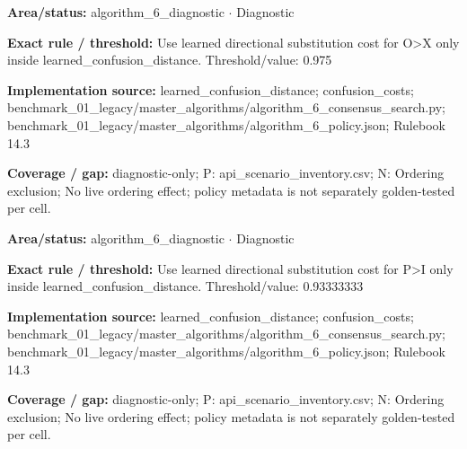 \begin{tcolorbox}[enhanced,breakable,colback=white,colframe=Muted!45,boxrule=0.45pt,arc=1.5pt,left=6pt,right=6pt,top=5pt,bottom=5pt,title={\texttt{A6-LEARNED-SUBSTITUTION-O-X}},title after break={\texttt{A6-LEARNED-SUBSTITUTION-O-X}\ (continued)},fonttitle=\headingfont\bfseries\color{Navy},coltitle=Navy]
\textbf{Area/status:} algorithm\_\allowbreak{}6\_\allowbreak{}diagnostic $\boldsymbol{\cdot}$ Diagnostic\par
\smallskip
\textbf{Exact rule / threshold:} Use learned directional substitution cost for O>X only inside learned\_\allowbreak{}confusion\_\allowbreak{}distance. Threshold/\allowbreak{}value: 0.975\par
\smallskip
\textbf{Implementation source:} learned\_\allowbreak{}confusion\_\allowbreak{}distance; confusion\_\allowbreak{}costs; benchmark\_\allowbreak{}01\_\allowbreak{}legacy/\allowbreak{}master\_\allowbreak{}algorithms/\allowbreak{}algorithm\_\allowbreak{}6\_\allowbreak{}consensus\_\allowbreak{}search.py; benchmark\_\allowbreak{}01\_\allowbreak{}legacy/\allowbreak{}master\_\allowbreak{}algorithms/\allowbreak{}algorithm\_\allowbreak{}6\_\allowbreak{}policy.json; Rulebook 14.3\par
\smallskip
\textbf{Coverage / gap:} diagnostic-only; P: api\_\allowbreak{}scenario\_\allowbreak{}inventory.csv; N: Ordering exclusion; No live ordering effect; policy metadata is not separately golden-tested per cell.
\end{tcolorbox}
\begin{tcolorbox}[enhanced,breakable,colback=white,colframe=Muted!45,boxrule=0.45pt,arc=1.5pt,left=6pt,right=6pt,top=5pt,bottom=5pt,title={\texttt{A6-LEARNED-SUBSTITUTION-P-I}},title after break={\texttt{A6-LEARNED-SUBSTITUTION-P-I}\ (continued)},fonttitle=\headingfont\bfseries\color{Navy},coltitle=Navy]
\textbf{Area/status:} algorithm\_\allowbreak{}6\_\allowbreak{}diagnostic $\boldsymbol{\cdot}$ Diagnostic\par
\smallskip
\textbf{Exact rule / threshold:} Use learned directional substitution cost for P>I only inside learned\_\allowbreak{}confusion\_\allowbreak{}distance. Threshold/\allowbreak{}value: 0.93333333\par
\smallskip
\textbf{Implementation source:} learned\_\allowbreak{}confusion\_\allowbreak{}distance; confusion\_\allowbreak{}costs; benchmark\_\allowbreak{}01\_\allowbreak{}legacy/\allowbreak{}master\_\allowbreak{}algorithms/\allowbreak{}algorithm\_\allowbreak{}6\_\allowbreak{}consensus\_\allowbreak{}search.py; benchmark\_\allowbreak{}01\_\allowbreak{}legacy/\allowbreak{}master\_\allowbreak{}algorithms/\allowbreak{}algorithm\_\allowbreak{}6\_\allowbreak{}policy.json; Rulebook 14.3\par
\smallskip
\textbf{Coverage / gap:} diagnostic-only; P: api\_\allowbreak{}scenario\_\allowbreak{}inventory.csv; N: Ordering exclusion; No live ordering effect; policy metadata is not separately golden-tested per cell.
\end{tcolorbox}
